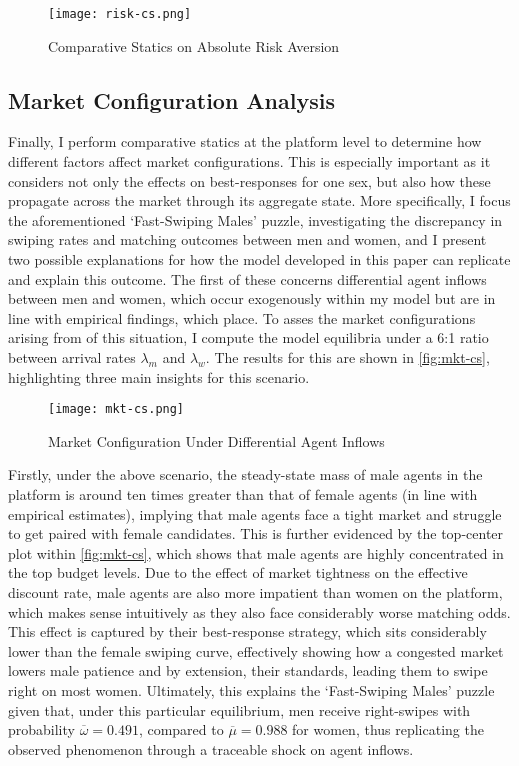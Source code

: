 \begin{figure}[ht]
    \centering
    \caption{Comparative Statics on Absolute Risk Aversion}
    \texttt{[image: risk-cs.png]}
    \label{fig:risk-cs} 
\end{figure}

\subsection{Market Configuration Analysis}\label{sec:section3.3} 
Finally, I perform comparative statics at the platform level to determine how different factors affect market configurations. This is especially important as it considers not only the effects on best-responses for one sex, but also how these propagate across the market through its aggregate state. More specifically, I focus the aforementioned `Fast-Swiping Males' puzzle, investigating the discrepancy in swiping rates and matching outcomes between men and women, and I present two possible explanations for how the model developed in this paper can replicate and explain this outcome. 
The first of these concerns differential agent inflows between men and women, which occur exogenously within my model but are in line with empirical findings, which place. To asses the market configurations arising from of this situation, I compute the model equilibria under a 6:1 ratio between arrival rates $\lambda_m$ and $\lambda_w$. The results for this are shown in \autoref{fig:mkt-cs}, highlighting three main insights for this scenario. 

\begin{figure}[ht]
    \centering
    \caption{Market Configuration Under Differential Agent Inflows}
    \texttt{[image: mkt-cs.png]}
    \label{fig:mkt-cs} 
\end{figure} 

Firstly, under the above scenario, the steady-state mass of male agents in the platform is around ten times greater than that of female agents (in line with empirical estimates), implying that male agents face a tight market and struggle to get paired with female candidates. This is further evidenced by the top-center plot within \autoref{fig:mkt-cs}, which shows that male agents are highly concentrated in the top budget levels. Due to the effect of market tightness on the effective discount rate, male agents are also more impatient than women on the platform, which makes sense intuitively as they also face considerably worse matching odds. This effect is captured by their best-response strategy, which sits considerably lower than the female swiping curve, effectively showing how a congested market lowers male patience and by extension, their standards, leading them to swipe right on most women. Ultimately, this explains the `Fast-Swiping Males' puzzle given that, under this particular equilibrium, men receive right-swipes with probability $\overline\omega=0.491$, compared to $\overline\mu=0.988$ for women, thus replicating the observed phenomenon through a traceable shock on agent inflows.